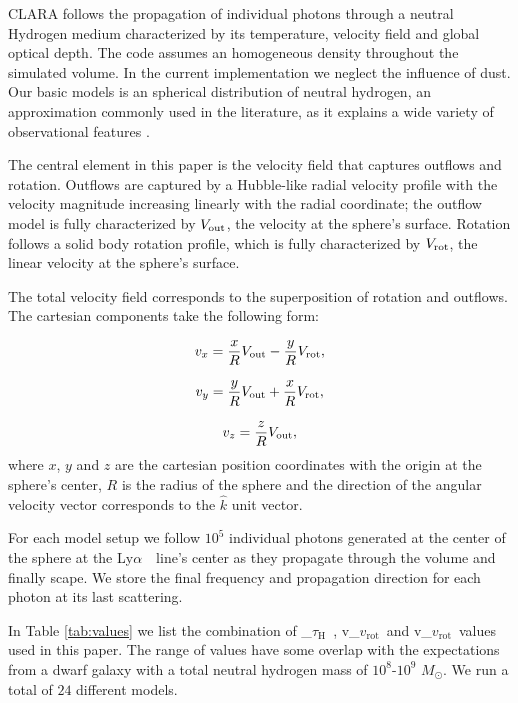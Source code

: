 \documentclass[a4paper,fleqn,usenatbib]{mnras}
\newcommand{\lya}{\ifmmode{{\rm Ly}\alpha}\else Ly$\alpha$\ \fi}
\newcommand{\vrot}{\ifmmode\mathrm v_{\mathrm{rot}}\else $v_{\mathrm{rot}}$~\fi}
\newcommand{\tauh}{\ifmmode\mathrm \tau_{\mathrm{H}}\else $\tau_{\mathrm{H}}$~\fi}
\begin{document}
CLARA follows the propagation of individual photons through a neutral
Hydrogen medium characterized by its temperature, velocity field and
global optical depth.
The code assumes an homogeneous density throughout the simulated
volume.
In the current implementation we neglect the influence of dust.
Our basic models is an spherical distribution of neutral hydrogen,
an approximation commonly used in the literature, as it explains a
wide variety of observational features \citep{Ahn03,Verhamme06,Dijkstra06}.


The central element in this paper is the velocity field that captures
outflows and rotation.
Outflows are captured by a Hubble-like radial velocity profile with
the velocity magnitude increasing linearly with the radial
coordinate; the outflow model is fully characterized by $V_{\rm out}$, the
velocity at the sphere's surface.
Rotation follows a solid body rotation profile, which is fully
characterized by $V_{\rm rot}$, the linear velocity at the sphere's surface.

The total velocity field corresponds to the superposition of rotation and
outflows.
The cartesian components take the following form:

\begin{equation}
	v_{x}=\frac{x}{R}V_{\rm out}-\frac{y}{R}V_{\rm rot} ,
	\label{eq:vx}
\end{equation}

\begin{equation}
	v_{y}=\frac{y}{R}V_{\rm out}+\frac{x}{R}V_{\rm rot} ,
	\label{eq:vy}
\end{equation}

\begin{equation}
	v_{z}=\frac{z}{R}V_{\rm out},
	\label{eq:vz}
\end{equation}
%
where $x$, $y$ and $z$ are the cartesian position coordinates with the
origin at the sphere's center, $R$ is the radius of the sphere and the
direction of the angular velocity vector corresponds to the $\hat{k}$
unit vector. 

For each model setup we follow $10^5$ individual photons generated at
the center of the sphere at the \lya\ line's center as they propagate
through the volume and finally scape.
We store the final frequency and propagation direction for each photon
at its last scattering.  


In Table \ref{tab:values} we list the combination of \tauh,
\vrot and \vrot values used in this paper.
The range of values have some overlap with the expectations from a dwarf
galaxy with a total neutral hydrogen mass of $10^8$-$10^9$ $M_{\odot}$.
We run a total of $24$ different models.
\end{document}
